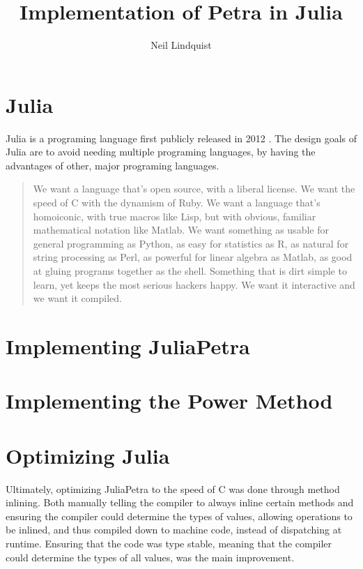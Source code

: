 \documentclass{article}
\title{Implementation of Petra in Julia}
\author{Neil Lindquist}
\begin{document}
	
\maketitle
	
\section{Julia}

Julia is a programing language first publicly released in 2012 \cite{WhyWeCreatedJulia}.
The design goals of Julia are to avoid needing multiple programing languages, by having
the advantages of other, major programing languages.

\begin{quote}
We want a language that’s open source, with a liberal license. We want the speed of C with the dynamism of Ruby. We want a language that’s homoiconic, with true macros like Lisp, but with obvious, familiar mathematical notation like Matlab. We want something as usable for general programming as Python, as easy for statistics as R, as natural for string processing as Perl, as powerful for linear algebra as Matlab, as good at gluing programs together as the shell. Something that is dirt simple to learn, yet keeps the most serious hackers happy. We want it interactive and we want it compiled.
\cite{WhyWeCreatedJulia}
\end{quote}



\section{Implementing JuliaPetra}

\section{Implementing the Power Method}

\section{Optimizing Julia}

Ultimately, optimizing JuliaPetra to the speed of C was done through method inlining.
Both manually telling the compiler to always inline certain methods and ensuring the
compiler could determine the types of values, allowing operations to be inlined, and
thus compiled down to machine code, instead of dispatching at runtime.
Ensuring that the code was type stable, meaning that the compiler could determine the
types of all values, was the main improvement.
\end{document}
